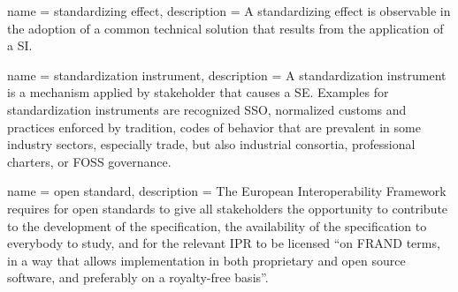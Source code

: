  { name = {standardizing effect}, description = {
    A standardizing effect is observable in the adoption of a common
    technical solution that results from the application of a
    \gls{SI}.} }

 { name = {standardization instrument},
  description = { A standardization instrument is a mechanism applied
    by stakeholder that causes a \gls{SE}. Examples for
    standardization instruments are recognized \gls{SSO}, normalized
    customs and practices enforced by tradition, codes of behavior
    that are prevalent in some industry sectors, especially trade, but
    also industrial consortia, professional charters, or \gls{FOSS}
    governance.} }

 { name = {open standard}, description = {
    The European Interoperability Framework requires for open
    standards to give all stakeholders the opportunity to contribute
    to the development of the specification, the availability of the
    specification to everybody to study, and for the relevant
    \gls{IPR} to be licensed ``on \gls{FRAND} terms, in a way that
    allows implementation in both proprietary and open source
    software, and preferably on a royalty-free
    basis''.\cite{flossary:ec-sep-2018} } }
